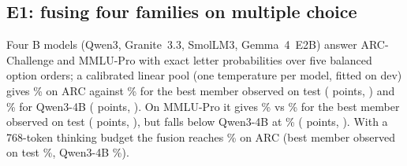 \documentclass[11pt]{article}
\theoremstyle{definition}
\theoremstyle{remark}
\begin{document}
\subsection{E1: fusing four families on multiple choice}
Four \eOneSwarmSize{}B models (Qwen3, Granite~3.3, SmolLM3, Gemma~4~E2B) answer ARC-Challenge and MMLU-Pro with
exact letter probabilities over five balanced option orders; a calibrated linear pool (one temperature per
model, fitted on dev) gives \eOneArcFusion\% on ARC against \eOneArcBest\% for the best member observed on test
(\eOneArcGain{} points, \eOneArcGainCI) and \eOneArcRef\% for Qwen3-4B
(\eOneArcRefGain{} points, \eOneArcRefGainCI). On MMLU-Pro it gives \eOneMmluFusion\% vs
\eOneMmluBest\% for the best member observed on test (\eOneMmluGain{} points, \eOneMmluGainCI), but
falls below Qwen3-4B at \eOneMmluRef\% (\eOneMmluRefGain{} points, \eOneMmluRefGainCI). With a 768-token thinking budget
the fusion reaches \eOneThinkArcFusion\% on ARC (best member observed on test \eOneThinkArcBest\%, Qwen3-4B
\eOneThinkArcRef\%).
\end{document}
